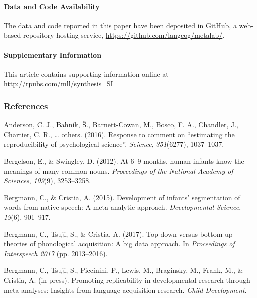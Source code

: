 \documentclass[english,floatsintext,man]{apa6}
\theoremstyle{definition}
\theoremstyle{definition}
\theoremstyle{remark}
\begin{document}
\paragraph{Data and Code Availability}\label{data-and-code-availability}

The data and code reported in this paper have been deposited in GitHub,
a web-based repository hosting service,
\url{https://github.com/langcog/metalab/}.

\paragraph{Supplementary Information}\label{supplementary-information}

This article contains supporting information online at
\url{http://rpubs.com/mll/synthesis_SI}

\newpage

\subsubsection{References}\label{references}

\setlength{\parindent}{-0.5in} \setlength{\leftskip}{0.5in}
\setlength{\parskip}{8pt}

\hypertarget{refs}{}
\hypertarget{ref-anderson2016response}{}
Anderson, C. J., Bahník, Š., Barnett-Cowan, M., Bosco, F. A., Chandler,
J., Chartier, C. R., \ldots{} others. (2016). Response to comment on
``estimating the reproducibility of psychological science''.
\emph{Science}, \emph{351}(6277), 1037--1037.

\hypertarget{ref-bergelson2016}{}
Bergelson, E., \& Swingley, D. (2012). At 6--9 months, human infants
know the meanings of many common nouns. \emph{Proceedings of the
National Academy of Sciences}, \emph{109}(9), 3253--3258.

\hypertarget{ref-bergmann2015development}{}
Bergmann, C., \& Cristia, A. (2015). Development of infants'
segmentation of words from native speech: A meta-analytic approach.
\emph{Developmental Science}, \emph{19}(6), 901--917.

\hypertarget{ref-bergmann2017}{}
Bergmann, C., Tsuji, S., \& Cristia, A. (2017). Top-down versus
bottom-up theories of phonological acquisition: A big data approach. In
\emph{Proceedings of Interspeech 2017} (pp. 2013--2016).

\hypertarget{ref-bergmanneducational}{}
Bergmann, C., Tsuji, S., Piccinini, P., Lewis, M., Braginsky, M., Frank,
M., \& Cristia, A. (in press). Promoting replicability in developmental
research through meta-analyses: Insights from language acquisition
research. \emph{Child Development}.
\end{document}
